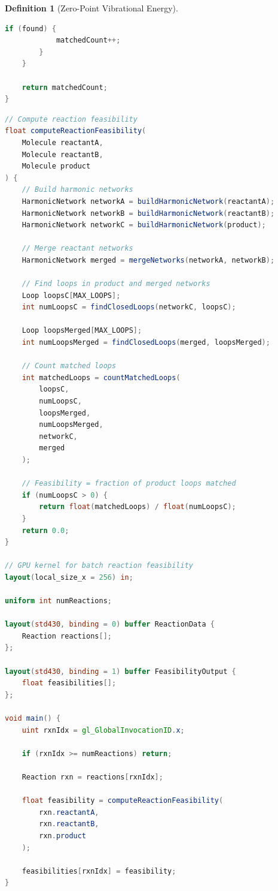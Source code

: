 \documentclass[11pt,a4paper]{article}
\theoremstyle{definition}
\newtheorem{definition}[theorem]{Definition}
\theoremstyle{remark}
\begin{document}
\begin{definition}[Zero-Point Vibrational Energy]
\begin{lstlisting}[language=GLSL,caption={Loop Matching}]
        if (found) {
            matchedCount++;
        }
    }
    
    return matchedCount;
}
\end{lstlisting}

\begin{lstlisting}[language=GLSL,caption={Reaction Feasibility Computation}]
// Compute reaction feasibility
float computeReactionFeasibility(
    Molecule reactantA,
    Molecule reactantB,
    Molecule product
) {
    // Build harmonic networks
    HarmonicNetwork networkA = buildHarmonicNetwork(reactantA);
    HarmonicNetwork networkB = buildHarmonicNetwork(reactantB);
    HarmonicNetwork networkC = buildHarmonicNetwork(product);
    
    // Merge reactant networks
    HarmonicNetwork merged = mergeNetworks(networkA, networkB);
    
    // Find loops in product and merged networks
    Loop loopsC[MAX_LOOPS];
    int numLoopsC = findClosedLoops(networkC, loopsC);
    
    Loop loopsMerged[MAX_LOOPS];
    int numLoopsMerged = findClosedLoops(merged, loopsMerged);
    
    // Count matched loops
    int matchedLoops = countMatchedLoops(
        loopsC,
        numLoopsC,
        loopsMerged,
        numLoopsMerged,
        networkC,
        merged
    );
    
    // Feasibility = fraction of product loops matched
    if (numLoopsC > 0) {
        return float(matchedLoops) / float(numLoopsC);
    }
    return 0.0;
}

// GPU kernel for batch reaction feasibility
layout(local_size_x = 256) in;

uniform int numReactions;

layout(std430, binding = 0) buffer ReactionData {
    Reaction reactions[];
};

layout(std430, binding = 1) buffer FeasibilityOutput {
    float feasibilities[];
};

void main() {
    uint rxnIdx = gl_GlobalInvocationID.x;
    
    if (rxnIdx >= numReactions) return;
    
    Reaction rxn = reactions[rxnIdx];
    
    float feasibility = computeReactionFeasibility(
        rxn.reactantA,
        rxn.reactantB,
        rxn.product
    );
    
    feasibilities[rxnIdx] = feasibility;
}
\end{lstlisting}


\end{definition}
\end{document}
